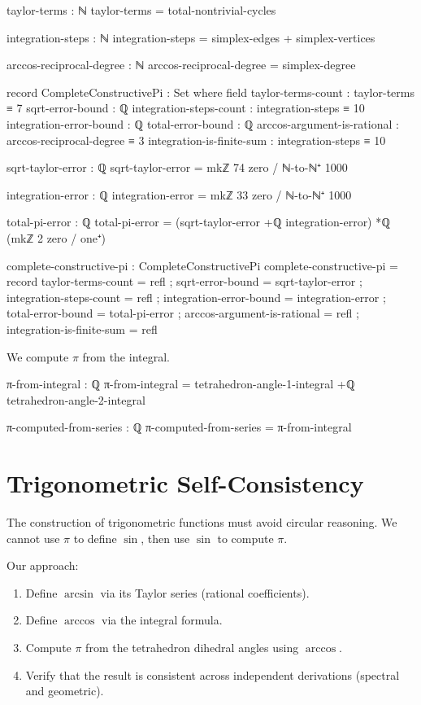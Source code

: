 \documentclass[11pt,a4paper]{book}
\begin{document}
\begin{code}
taylor-terms : ℕ
taylor-terms = total-nontrivial-cycles

integration-steps : ℕ
integration-steps = simplex-edges + simplex-vertices

arccos-reciprocal-degree : ℕ
arccos-reciprocal-degree = simplex-degree

record CompleteConstructivePi : Set where
  field
    taylor-terms-count : taylor-terms ≡ 7
    sqrt-error-bound : ℚ
    integration-steps-count : integration-steps ≡ 10
    integration-error-bound : ℚ
    total-error-bound : ℚ
    arccos-argument-is-rational : arccos-reciprocal-degree ≡ 3
    integration-is-finite-sum : integration-steps ≡ 10

sqrt-taylor-error : ℚ
sqrt-taylor-error = mkℤ 74 zero / ℕ-to-ℕ⁺ 1000

integration-error : ℚ
integration-error = mkℤ 33 zero / ℕ-to-ℕ⁺ 1000

total-pi-error : ℚ
total-pi-error = (sqrt-taylor-error +ℚ integration-error) *ℚ (mkℤ 2 zero / one⁺)

complete-constructive-pi : CompleteConstructivePi
complete-constructive-pi = record
  { taylor-terms-count = refl
  ; sqrt-error-bound = sqrt-taylor-error
  ; integration-steps-count = refl
  ; integration-error-bound = integration-error
  ; total-error-bound = total-pi-error
  ; arccos-argument-is-rational = refl
  ; integration-is-finite-sum = refl
  }
\end{code}

We compute $\pi$ from the integral.

\begin{code}
π-from-integral : ℚ
π-from-integral = tetrahedron-angle-1-integral +ℚ tetrahedron-angle-2-integral

π-computed-from-series : ℚ
π-computed-from-series = π-from-integral
\end{code}

\section{Trigonometric Self-Consistency}

The construction of trigonometric functions must avoid circular reasoning.
We cannot use $\pi$ to define $\sin$, then use $\sin$ to compute $\pi$.

Our approach:
\begin{enumerate}
\item Define $\arcsin$ via its Taylor series (rational coefficients).
\item Define $\arccos$ via the integral formula.
\item Compute $\pi$ from the tetrahedron dihedral angles using $\arccos$.
\item Verify that the result is consistent across independent derivations (spectral and geometric).
\end{enumerate}
\end{document}
